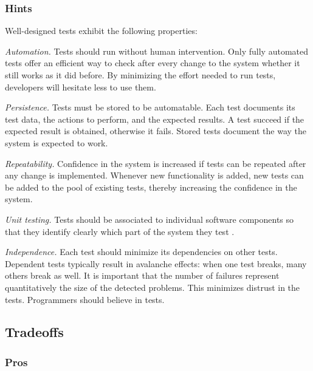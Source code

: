 \documentclass[a4paper,10pt,twoside]{book}
\begin{document}
\subsubsection*{Hints}

Well-designed tests exhibit the following properties:

\begin{bulletlist}
\item \emph{Automation.}
Tests should run without human intervention. Only fully automated tests offer an efficient way to check after every change to the system whether it still works as it did before. By minimizing the effort needed to run tests, developers will hesitate less to use them.

\item \emph{Persistence.}
Tests must be stored to be automatable. Each test documents its test data, the actions to perform, and the expected results. A test succeed if the expected result is obtained, otherwise it fails. Stored tests document the way the system is expected to work.

\item \emph{Repeatability.}
Confidence in the system is increased if tests can be repeated after any change is implemented. Whenever new functionality is added, new tests can be added to the pool of existing tests, thereby increasing the confidence in the system.

\item \emph{Unit testing.}
Tests should be associated to individual software components so that they identify clearly which part of the system they test \cite{Davi95a}.

\item \emph{Independence.}
Each test should minimize its dependencies on other tests. Dependent tests typically result in avalanche effects: when one test breaks, many others break as well. It is important that the number of failures represent quantitatively the size of the detected problems. This minimizes distrust in the tests. Programmers should believe in tests.
\end{bulletlist}

\subsection*{Tradeoffs}

\subsubsection*{Pros}
\end{document}
